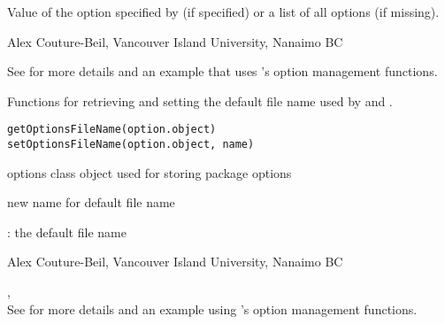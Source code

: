 \documentclass[letterpaper]{book}
\begin{document}
%
\begin{Value}
Value of the option specified by  (if specified) or a list
of all options (if missing).
\end{Value}
%
\begin{Author}\relax
Alex Couture-Beil, Vancouver Island University, Nanaimo BC
\end{Author}
%
\begin{SeeAlso}\relax
See  for more details and 
an example that uses 's option management functions.
\end{SeeAlso}
%
\begin{Description}\relax
Functions for retrieving and setting the default file name used by  and .
\end{Description}
%
\begin{Usage}
\begin{verbatim}
getOptionsFileName(option.object)
setOptionsFileName(option.object, name)
\end{verbatim}
\end{Usage}
%
\begin{Arguments}
\begin{ldescription}
\item[\code{option.object}] options class object used for storing package options
\item[\code{name}] new name for default file name
\end{ldescription}
\end{Arguments}
%
\begin{Value}
: the default file name
\end{Value}
%
\begin{Author}\relax
Alex Couture-Beil, Vancouver Island University, Nanaimo BC
\end{Author}
%
\begin{SeeAlso}\relax
{},  \\{}
See  for more details and 
an example using 's option management functions.
\end{SeeAlso}
\end{document}
